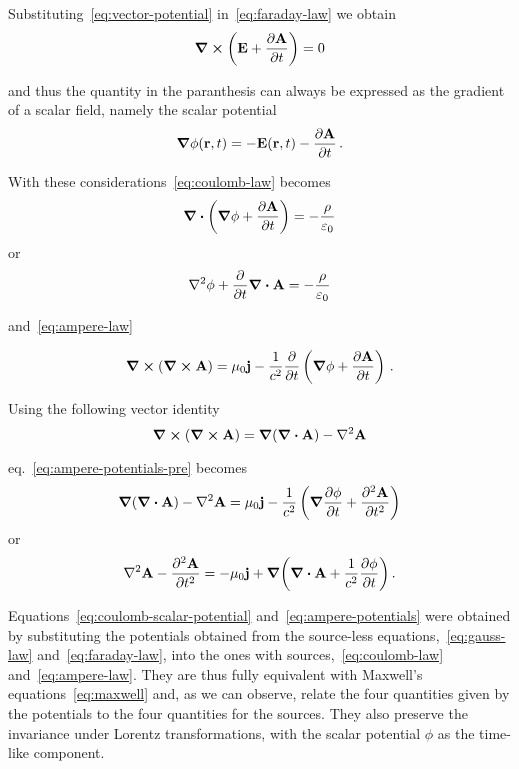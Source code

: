 \documentclass[../thesis.tex]{subfiles}
\begin{document}
Substituting~\eqref{eq:vector-potential} in~\eqref{eq:faraday-law} we obtain
\begin{equation}
  \label{eq:faraday-vector-potential}
  \curl(\vb{E} + \pdv{\vb{A}}{t}) = 0
\end{equation}

and thus the quantity in the paranthesis can always be expressed as the
gradient of a scalar field, namely the scalar potential
\[
\grad{\phi}(\vb{r}, t) = -\vb{E}(\vb{r}, t) - \pdv{\vb{A}}{t}\,.
\]

With these considerations~\eqref{eq:coulomb-law} becomes
\[
  \div(\grad{\phi} + \pdv{\vb{A}}{t}) = - \frac{\rho}{\varepsilon_0}
\]
or
\begin{equation}
  \label{eq:coulomb-scalar-potential}
  \laplacian{\phi} + \pdv{t}\div{\vb{A}} = - \frac{\rho}{\varepsilon_0}
\end{equation}

and~\eqref{eq:ampere-law}

\begin{equation}
  \label{eq:ampere-potentials-pre}
  \curl(\curl{\vb{A}}) = \mu_0 \vb{j}
    - \frac{1}{c^2} \pdv{t} \left( \grad{\phi} + \pdv{\vb{A}}{t} \right)\,.
\end{equation}

Using the following vector identity
\[
  \curl(\curl{\vb{A}}) = \grad(\div{\vb{A}}) - \laplacian{\vb{A}}
\]

eq.~\eqref{eq:ampere-potentials-pre} becomes
\[
  \grad(\div{\vb{A}}) - \laplacian{\vb{A}} = \mu_0 \vb{j}
    - \frac{1}{c^2} \left( \grad{\pdv{\phi}{t}} + \pdv[2]{\vb{A}}{t} \right)
\]
or
\begin{equation}
  \label{eq:ampere-potentials}
  \laplacian{\vb{A}} - \pdv[2]{\vb{A}}{t} =
    -\mu_0 \vb{j} + \grad(\div{\vb{A}} + \frac{1}{c^2} \pdv{\phi}{t})\,.
\end{equation}

Equations~\eqref{eq:coulomb-scalar-potential} and~\eqref{eq:ampere-potentials}
were obtained by substituting the potentials obtained from the source-less
equations,~\eqref{eq:gauss-law} and~\eqref{eq:faraday-law}, into the ones
with sources,~\eqref{eq:coulomb-law} and~\eqref{eq:ampere-law}. They are thus
fully equivalent with Maxwell's equations~\eqref{eq:maxwell} and, as we can observe,
relate the four quantities given by the potentials to the four quantities for the
sources. They also preserve the invariance under Lorentz transformations, with
the scalar potential \(\phi\) as the time-like component.
\end{document}
